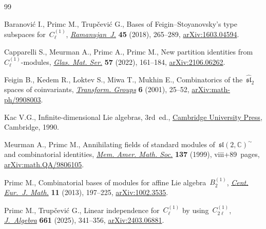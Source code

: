 \documentclass[10pt,a4paper]{amsart}
\numberwithin{equation}{section}
\begin{document}
\begin{thebibliography}{99}
\footnotesize\itemsep=0pt

Baranovi\'c I., Primc M., Trup\v{c}evi\'c G., Bases of
  {F}eigin--{S}toyanovsky's type subspaces for~{$C_\ell^{(1)}$},
  \href{https://doi.org/10.1007/s11139-016-9840-y}{\textit{Ramanujan~J.}}
  \textbf{45} (2018), 265--289,
  \href{http://arxiv.org/abs/1603.04594}{arXiv:1603.04594}.

Capparelli S., Meurman A., Primc A., Primc M., New partition identities
  from~{$C^{(1)}_\ell$}-modules,
  \href{https://doi.org/10.3336/gm.57.2.01}{\textit{Glas. Mat. Ser.}}
  \textbf{57} (2022), 161--184,
  \href{http://arxiv.org/abs/2106.06262}{arXiv:2106.06262}.

Feigin B., Kedem R., Loktev S., Miwa T., Mukhin E., Combinatorics of
  the~{$\widehat{\mathfrak{sl}}_2$} spaces of coinvariants,
  \href{https://doi.org/10.1007/BF01236061}{\textit{Transform. Groups}}
  \textbf{6} (2001), 25--52,
  \href{http://arxiv.org/abs/math-ph/9908003}{arXiv:math-ph/9908003}.

Kac V.G., Infinite-dimensional {L}ie algebras, 3rd~ed.,
  \href{https://doi.org/10.1017/CBO9780511626234}{Cambridge University Press}, Cambridge, 1990.

Meurman A., Primc M., Annihilating fields of standard modules
  of~{$\mathfrak{sl}(2,\mathbb{C})^\sim$} and combinatorial identities,
  \href{https://doi.org/10.1090/memo/0652}{\textit{Mem. Amer. Math. Soc.}}
  \textbf{137} (1999), viii+89~pages,
  \href{http://arxiv.org/abs/math.QA/9806105}{arXiv:math.QA/9806105}.

Primc M., Combinatorial bases of modules for affine {L}ie
  algebra~{$B_2^{(1)}$},
  \href{https://doi.org/10.2478/s11533-012-0111-x}{\textit{Cent. Eur.~J.
  Math.}} \textbf{11} (2013), 197--225,
  \href{http://arxiv.org/abs/1002.3535}{arXiv:1002.3535}.

Primc M., Trup\v{c}evi\'c G., Linear independence for~{$C_\ell^{(1)}$} by
  using~{$C_{2\ell}^{(1)}$},
  \href{https://doi.org/10.1016/j.jalgebra.2024.08.003}{\textit{J.~Algebra}}
  \textbf{661} (2025), 341--356,
  \href{http://arxiv.org/abs/2403.06881}{arXiv:2403.06881}.

\end{thebibliography}
\end{document}

